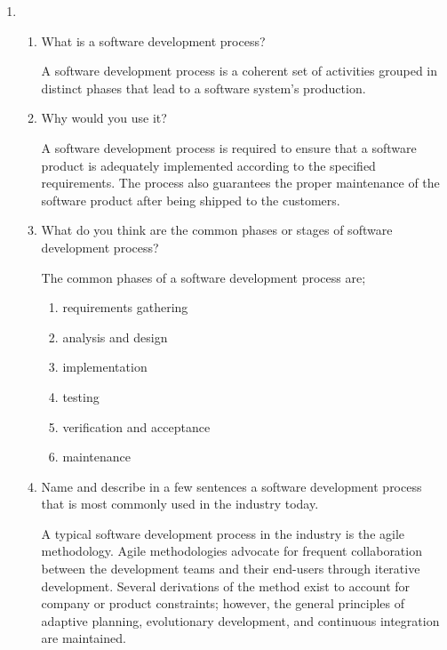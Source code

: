 \documentclass{article}
\begin{document}
  \begin{enumerate}[resume]

    \item
    \begin{enumerate}
      \item What is a software development process?

      A software development process is a coherent set of activities grouped in distinct phases that lead to a software system's production.

      \item Why would you use it?

      A software development process is required to ensure that a software product is adequately implemented according to the specified requirements. The process also guarantees the proper maintenance of the software product after being shipped to the customers.

      \item What do you think are the common phases or stages of software development process?

      The common phases of a software development process are;
      \begin{enumerate}
        \item requirements gathering
        \item analysis and design
        \item implementation
        \item testing
        \item verification and acceptance
        \item maintenance
      \end{enumerate}

      \item Name and describe in a few sentences a software development process that is most commonly used in the industry today.

      A typical software development process in the industry is the agile methodology. Agile methodologies advocate for frequent collaboration between the development teams and their end-users through iterative development. Several derivations of the method exist to account for company or product constraints; however, the general principles of adaptive planning, evolutionary development, and continuous integration are maintained.

    \end{enumerate}
  \end{enumerate}
\end{document}
